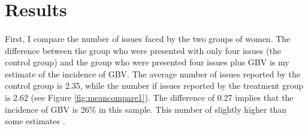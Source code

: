 \documentclass[11pt,a4paper]{scrartcl} %
\begin{document}

% 	







\section*{Results}

%	
%



\paragraph{}
First, I compare the number of issues faced by the two groups of women. The difference between the group who were presented with only four issues (the control group) and the group who were presented four issues plus GBV is my estimate of the incidence of GBV. The average number of issues reported by the control group is 2.35, while the number if issues reported by the treatment group is 2.62 (see Figure \ref{fig:meancompare1}). The difference of 0.27 implies that the incidence of GBV is 26\% in this sample. This number of slightly higher than some estimates \citep{Quattrochi2019}.
\end{document}
